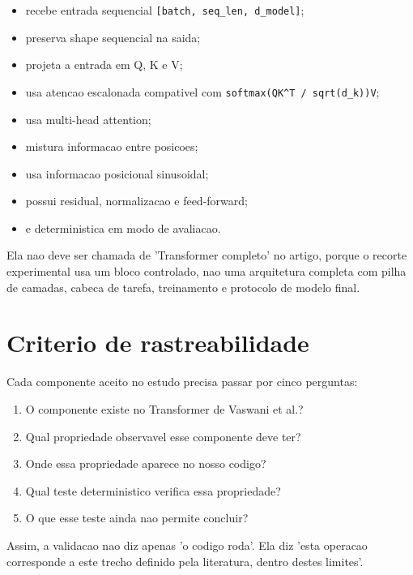 \begin{itemize}
\item recebe entrada sequencial \texttt{[batch, seq\_\allowbreak{}len, d\_\allowbreak{}model]};
\item preserva shape sequencial na saida;
\item projeta a entrada em Q, K e V;
\item usa atencao escalonada compativel com \texttt{softmax(QK\textasciicircum{}T /\allowbreak{} sqrt(d\_\allowbreak{}k))V};
\item usa multi-head attention;
\item mistura informacao entre posicoes;
\item usa informacao posicional sinusoidal;
\item possui residual, normalizacao e feed-forward;
\item e deterministica em modo de avaliacao.
\end{itemize}




Ela nao deve ser chamada de 'Transformer completo' no artigo, porque o recorte experimental usa um bloco controlado, nao uma arquitetura completa com pilha de camadas, cabeca de tarefa, treinamento e protocolo de modelo final.



\section{Criterio de rastreabilidade}



Cada componente aceito no estudo precisa passar por cinco perguntas:


\begin{enumerate}
\item O componente existe no Transformer de Vaswani et al.?
\item Qual propriedade observavel esse componente deve ter?
\item Onde essa propriedade aparece no nosso codigo?
\item Qual teste deterministico verifica essa propriedade?
\item O que esse teste ainda nao permite concluir?
\end{enumerate}



Assim, a validacao nao diz apenas 'o codigo roda'. Ela diz 'esta operacao corresponde a este trecho definido pela literatura, dentro destes limites'.



